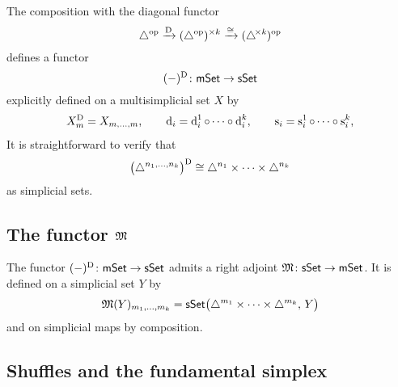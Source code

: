 The composition with the diagonal functor
\[
\triangle^{\mathrm{op}} \xrightarrow{\mathrm{D}}
(\triangle^{\mathrm{op}})^{\times k} \xrightarrow{\cong}
(\triangle^{\!\times\mathit{k}})^{\mathrm{op}}
\]
defines a functor
\[
(-)^{\mathrm{D}} \colon \mathsf{mSet} \to \mathsf{sSet}
\]
explicitly defined on a multisimplicial set $X$ by
\begin{gather*}
X^{\mathrm{D}}_m = X_{m, \dots, m},
\qquad
\operatorname{d}_i = \operatorname{d}_i^1 \circ \dots \circ \operatorname{d}_i^k,
\qquad
\operatorname{s}_i = \operatorname{s}_i^1 \circ \dots \circ \operatorname{s}_i^k,
\end{gather*}
It is straightforward to verify that
\[
\big( \triangle^{n_1, \dots, n_k} \big)^{\mathrm{D}} \cong
\triangle^{n_1} \times \dots \times \triangle^{n_k}
\]
as simplicial sets.

\subsection{The functor $\operatorname{\mathfrak{M}}$}

The functor $(-)^{\mathrm{D}} \colon \mathsf{mSet} \to \mathsf{sSet}$ admits a right adjoint $\operatorname{\mathfrak{M}} \colon \mathsf{sSet} \to \mathsf{mSet}$.
It is defined on a simplicial set $Y$ by
\[
\operatorname{\mathfrak{M}}(Y)_{m_1, \dots, m_k} =
\mathsf{sSet}\big( \triangle^{m_1} \times \dots \times \triangle^{m_k}, \, Y \big)
\]
and on simplicial maps by composition.

\subsection{Shuffles and the fundamental simplex} \label{ss:shuffles and fundamental simplex}


